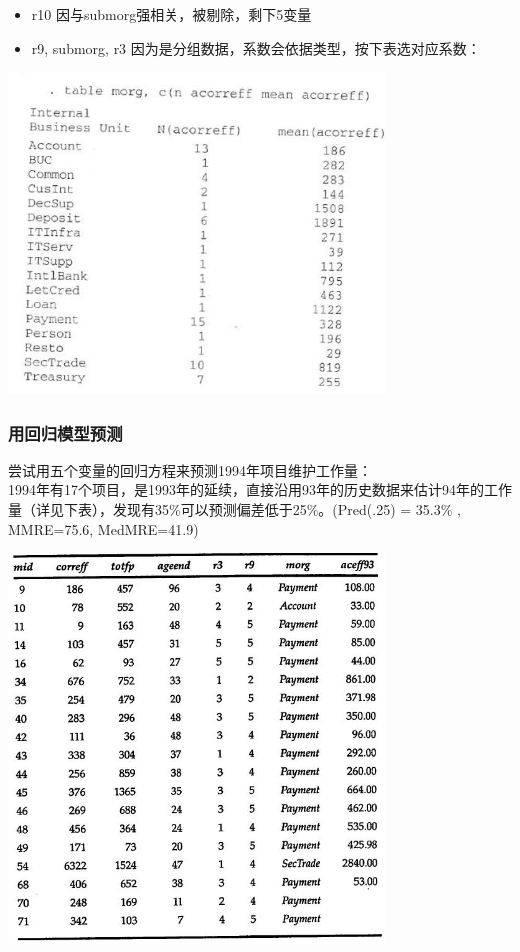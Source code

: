 \begin{itemize}
\tightlist
\item
  r10 因与submorg强相关，被剔除，剩下5变量
\item
  r9, submorg, r3 因为是分组数据，系数会依据类型，按下表选对应系数：
\end{itemize}


\includegraphics[width=10cm]{maxwell_e514.jpg}

\hypertarget{ux7528ux56deux5f52ux6a21ux578bux9884ux6d4b}{%
\subsubsection{用回归模型预测}\label{ux7528ux56deux5f52ux6a21ux578bux9884ux6d4b}}

尝试用五个变量的回归方程来预测1994年项目维护工作量：\\
1994年有17个项目，是1993年的延续，直接沿用93年的历史数据来估计94年的工作量（详见下表），发现有35\%可以预测偏差低于25\%。(Pred(.25)
= 35.3\% , MMRE=75.6, MedMRE=41.9)


\includegraphics[width=10cm]{maxwell_t515.jpg}

